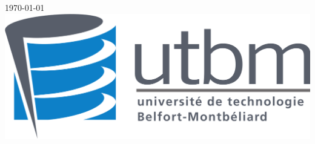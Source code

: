\documentclass[a4paper, sans]{article}
\begin{document}
\begin{titlepage}
      {\large \today}\\[2cm] %
      
      
      \includegraphics[scale=0.18]{img/utbm_logo.png}\\[1cm] %
      
      
      \vfill %
      
    \end{titlepage}
    \thispagestyle{empty}

    \clearpage

    \setcounter{tocdepth}{2}
    {\hypersetup{linkcolor=black}
    \tableofcontents }

    \newpage

    

    
    
    

    
    
\end{document}
